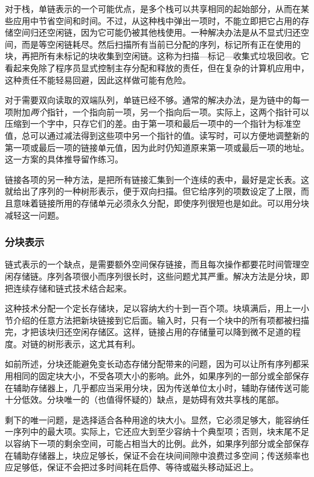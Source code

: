 \documentclass[twoside,11pt,fontset=none]{ctexbook}
\begin{document}
对于栈，单链表示的一个可能优点，是多个栈可以共享相同的起始部分，从而在某些应用中节省空间和时间。不过，从这种栈中弹出一项时，不能立即把它占用的存储空间归还空闲链，因为它可能仍被其他栈使用。一种解决办法是从不显式归还空间，而是等空闲链耗尽。然后扫描所有当前已分配的序列，标记所有正在使用的块，再把所有未标记的块收集到空闲链。这称为扫描—标记—收集式垃圾回收。它看起来免除了程序员显式控制主存分配和释放的责任，但在复杂的计算机应用中，这种责任不能轻易回避，因此这样做可能有危险。

对于需要双向读取的双端队列，单链已经不够。通常的解决办法，是为链中的每一项附加\textit{两个}指针，一个指向前一项，另一个指向后一项。实际上，这两个指针可以压缩到一个字中，只存它们的差。由于第一项和最后一项中的一个指针为标准空值，总可以通过减法得到这些项中另一个指针的值。读写时，可以方便地调整新的第一项或最后一项的链接单元值，因为此时仍知道原来第一项或最后一项的地址。这一方案的具体推导留作练习。

链接各项的另一种方法，是把所有链接汇集到一个连续的表中，最好是定长表。这就给出了序列的一种树形表示，便于双向扫描。但它给序列的项数设定了上限，而且意味着链接所用的存储单元必须永久分配，即使序列很短也是如此。可以用分块减轻这一问题。

\subsubsection{分块表示}

链式表示的一个缺点，是需要额外空间保存链接，而且每次操作都要花时间管理空闲存储链。序列各项很小而序列很长时，这些问题尤其严重。解决方法是分块，即把连续存储和链式技术结合起来。

这种技术分配一个定长存储块，足以容纳大约十到一百个项。块填满后，用上一小节介绍的任意方法把新块链接到它后面。输入时，只有一个块中的所有项都被扫描完，才把该块归还空闲存储区。这样，链接占用的存储量可以降到微不足道的程度。对链的树形表示，这尤其有利。

如前所述，分块还能避免变长动态存储分配带来的问题，因为可以让所有序列都采用相同的固定块大小，不受各项大小的影响。此外，如果序列的一部分或全部保存在辅助存储器上，几乎都应当采用分块，因为传送单位太小时，辅助存储传送可能十分低效。分块唯一的（也值得怀疑的）缺点，是妨碍有效共享栈的尾部。

剩下的唯一问题，是选择适合各种用途的块大小。显然，它必须足够大，能容纳任一序列中的最大项。实际上，它还应大到至少容纳十个典型项；否则，块末尾不足以容纳下一项的剩余空间，可能占相当大的比例。此外，如果序列部分或全部保存在辅助存储器上，块应足够长，保证不会在块间间隙中浪费过多空间；传送频率也应足够低，保证不会把过多时间耗在启停、等待或磁头移动延迟上。
\end{document}
